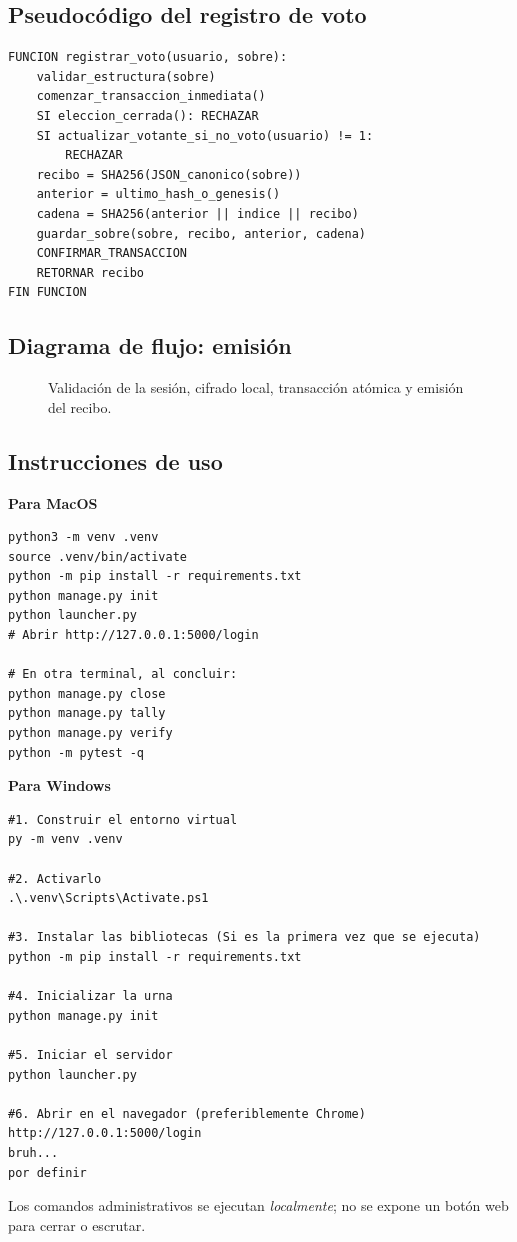 \subsection{Pseudocódigo del registro de voto}
\begin{lstlisting}
FUNCION registrar_voto(usuario, sobre):
    validar_estructura(sobre)
    comenzar_transaccion_inmediata()
    SI eleccion_cerrada(): RECHAZAR
    SI actualizar_votante_si_no_voto(usuario) != 1:
        RECHAZAR
    recibo = SHA256(JSON_canonico(sobre))
    anterior = ultimo_hash_o_genesis()
    cadena = SHA256(anterior || indice || recibo)
    guardar_sobre(sobre, recibo, anterior, cadena)
    CONFIRMAR_TRANSACCION
    RETORNAR recibo
FIN FUNCION
\end{lstlisting}
\subsection{Diagrama de flujo: emisión}
\begin{figure}[H]\centering
\resizebox{0.85\linewidth}{!}{}
\caption{Validación de la sesión, cifrado local, transacción atómica y emisión del recibo.}
\end{figure}

\subsection{Instrucciones de uso}
\textbf{Para MacOS}
\begin{lstlisting}
python3 -m venv .venv
source .venv/bin/activate
python -m pip install -r requirements.txt
python manage.py init
python launcher.py
# Abrir http://127.0.0.1:5000/login

# En otra terminal, al concluir:
python manage.py close
python manage.py tally
python manage.py verify
python -m pytest -q
\end{lstlisting}

\newpage
\textbf{Para Windows}
\begin{lstlisting}
#1. Construir el entorno virtual
py -m venv .venv

#2. Activarlo
.\.venv\Scripts\Activate.ps1

#3. Instalar las bibliotecas (Si es la primera vez que se ejecuta)
python -m pip install -r requirements.txt

#4. Inicializar la urna
python manage.py init

#5. Iniciar el servidor
python launcher.py

#6. Abrir en el navegador (preferiblemente Chrome) http://127.0.0.1:5000/login
bruh...
por definir
\end{lstlisting}
Los comandos administrativos se ejecutan \emph{localmente}; no se expone un botón web para cerrar o escrutar. 

